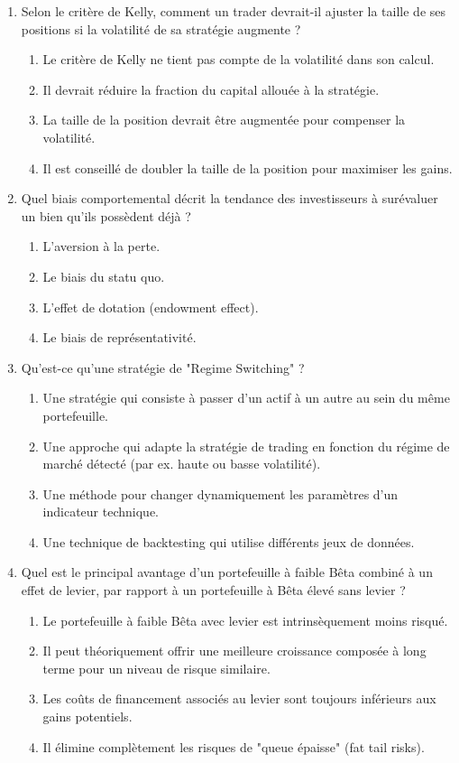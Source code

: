 \documentclass[a4paper,12pt]{article}
\begin{document}
\begin{enumerate}
    \item Selon le critère de Kelly, comment un trader devrait-il ajuster la taille de ses positions si la volatilité de sa stratégie augmente ?
    \begin{enumerate}[label=(\Alph*)]
        \item Le critère de Kelly ne tient pas compte de la volatilité dans son calcul.
        \item Il devrait réduire la fraction du capital allouée à la stratégie.
        \item La taille de la position devrait être augmentée pour compenser la volatilité.
        \item Il est conseillé de doubler la taille de la position pour maximiser les gains.
    \end{enumerate}

    \item Quel biais comportemental décrit la tendance des investisseurs à surévaluer un bien qu'ils possèdent déjà ?
    \begin{enumerate}[label=(\Alph*)]
        \item L'aversion à la perte.
        \item Le biais du statu quo.
        \item L'effet de dotation (endowment effect).
        \item Le biais de représentativité.
    \end{enumerate}

    \item Qu'est-ce qu'une stratégie de "Regime Switching" ?
    \begin{enumerate}[label=(\Alph*)]
        \item Une stratégie qui consiste à passer d'un actif à un autre au sein du même portefeuille.
        \item Une approche qui adapte la stratégie de trading en fonction du régime de marché détecté (par ex. haute ou basse volatilité).
        \item Une méthode pour changer dynamiquement les paramètres d'un indicateur technique.
        \item Une technique de backtesting qui utilise différents jeux de données.
    \end{enumerate}
    
    \item Quel est le principal avantage d'un portefeuille à faible Bêta combiné à un effet de levier, par rapport à un portefeuille à Bêta élevé sans levier ?
    \begin{enumerate}[label=(\Alph*)]
        \item Le portefeuille à faible Bêta avec levier est intrinsèquement moins risqué.
        \item Il peut théoriquement offrir une meilleure croissance composée à long terme pour un niveau de risque similaire.
        \item Les coûts de financement associés au levier sont toujours inférieurs aux gains potentiels.
        \item Il élimine complètement les risques de "queue épaisse" (fat tail risks).
    \end{enumerate}
    

\end{enumerate}
\end{document}
